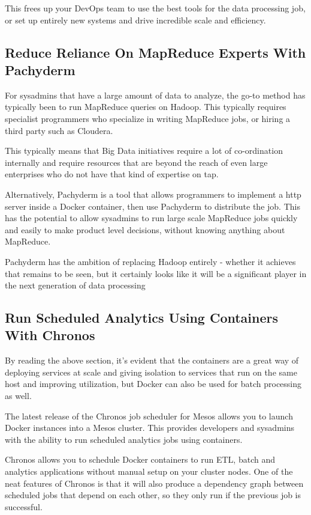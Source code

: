 \documentclass[sigconf]{acmart}
\begin{document}
	This frees up your DevOps team to use the best tools for the data processing job, or set up entirely new systems and drive incredible scale and efficiency.
	
	\subsection{Reduce Reliance On MapReduce Experts With Pachyderm}
	For sysadmins that have a large amount of data to analyze, the go-to method has typically been to run MapReduce queries on Hadoop. This typically requires specialist programmers who specialize in writing MapReduce jobs, or hiring a third party such as Cloudera.
	
	This typically means that Big Data initiatives require a lot of co-ordination internally and require resources that are beyond the reach of even large enterprises who do not have that kind of expertise on tap.
	
	Alternatively, Pachyderm is a tool that allows programmers to implement a http server inside a Docker container, then use Pachyderm to distribute the job. This has the potential to allow sysadmins to run large scale MapReduce jobs quickly and easily to make product level decisions, without knowing anything about MapReduce.\cite{pachyderm}
	
	Pachyderm has the ambition of replacing Hadoop entirely - whether it achieves that remains to be seen, but it certainly looks like it will be a significant player in the next generation of data processing
	\subsection{Run Scheduled Analytics Using Containers With Chronos}
	By reading the above section, it's evident that the containers are a great way of deploying services at scale and giving isolation to services that run on the same host and improving utilization, but Docker can also be used for batch processing as well.
	
	The latest release of the Chronos job scheduler for Mesos allows you to launch Docker instances into a Mesos cluster. This provides developers and sysadmins with the ability to run scheduled analytics jobs using containers.\cite{Chronos}
	
	Chronos allows you to schedule Docker containers to run ETL, batch and analytics applications without manual setup on your cluster nodes. One of the neat features of Chronos is that it will also produce a dependency graph between scheduled jobs that depend on each other, so they only run if the previous job is successful.
	
\end{document}
